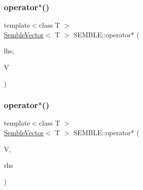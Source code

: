 \mbox{\label{namespaceSEMBLE_a816be7bea618689cc476ee8bea59c149}} 
\subsubsection{\texorpdfstring{operator$\ast$()}{operator*()}\hspace{0.1cm}{\footnotesize\ttfamily [6/20]}}
{\footnotesize\ttfamily template$<$class T $>$ \\
\mbox{\hyperlink{structSEMBLE_1_1SembleVector}{Semble\+Vector}}$<$ T $>$ S\+E\+M\+B\+L\+E\+::operator$\ast$ (\begin{DoxyParamCaption}\item[{const typename \mbox{\hyperlink{structSEMBLE_1_1PromoteScalar}{Promote\+Scalar}}$<$ T $>$\+::Type \&}]{lhs,  }\item[{const \mbox{\hyperlink{structSEMBLE_1_1SembleVector}{Semble\+Vector}}$<$ T $>$ \&}]{V }\end{DoxyParamCaption})}

\mbox{\label{namespaceSEMBLE_a2013893de76572174b6ed2c5bf85f639}} 
\subsubsection{\texorpdfstring{operator$\ast$()}{operator*()}\hspace{0.1cm}{\footnotesize\ttfamily [7/20]}}
{\footnotesize\ttfamily template$<$class T $>$ \\
\mbox{\hyperlink{structSEMBLE_1_1SembleVector}{Semble\+Vector}}$<$ T $>$ S\+E\+M\+B\+L\+E\+::operator$\ast$ (\begin{DoxyParamCaption}\item[{const \mbox{\hyperlink{structSEMBLE_1_1SembleVector}{Semble\+Vector}}$<$ T $>$ \&}]{V,  }\item[{const typename \mbox{\hyperlink{structSEMBLE_1_1PromoteEnsem}{Promote\+Ensem}}$<$ T $>$\+::Type \&}]{rhs }\end{DoxyParamCaption})}

\mbox{\label{namespaceSEMBLE_a87b964977248d89a4706463afcd376eb}} 
